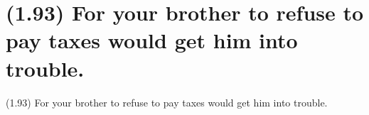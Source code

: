 \documentclass{article}
\begin{document}
\clearpage

%
%

\section*{(1.93) For your brother to refuse to pay taxes would get him into trouble.}

\bigbreak
\begin{enumerate*}
\item[(1.93)] For your brother to refuse to pay taxes would get him into trouble.
\end{enumerate*}
\bigbreak
\end{document}
